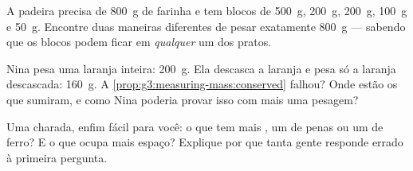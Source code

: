 \begin{exercise}[$\star$]\label{exo:g3:measuring-mass:9}
A padeira precisa de \qty{800}{g} de farinha e tem blocos de
\qty{500}{g}, \qty{200}{g}, \qty{200}{g}, \qty{100}{g} e
\qty{50}{g}. Encontre duas maneiras diferentes de pesar exatamente
\qty{800}{g} --- sabendo que os blocos podem ficar em
\emph{qualquer} um dos pratos.
\end{exercise}

\begin{exercise}[$\star\star$]\label{exo:g3:measuring-mass:10}
Nina pesa uma laranja inteira: \qty{200}{g}. Ela descasca a laranja e
pesa só a laranja descascada: \qty{160}{g}. A
\cref{prop:g3:measuring-mass:conserved} falhou? Onde estão os 
que sumiram, e como Nina poderia provar isso com mais uma pesagem?
\end{exercise}

\begin{exercise}[$\star\star$]\label{exo:g3:measuring-mass:11}
Uma charada, enfim fácil para você: o que tem mais , um
 de penas ou um  de ferro? E o que ocupa mais
espaço? Explique por que tanta gente responde errado à primeira
pergunta.
\end{exercise}
